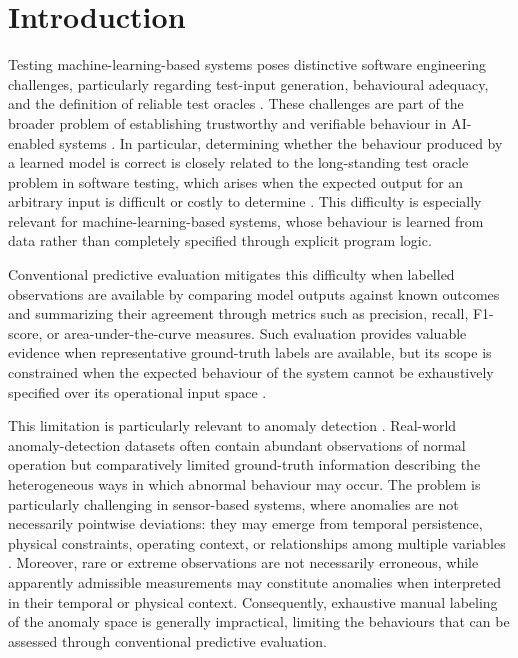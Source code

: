\documentclass[preprint,12pt]{elsarticle}
\begin{document}
\section{Introduction}
\label{sec:introduction}

Testing machine-learning-based systems poses distinctive software
engineering challenges, particularly regarding test-input generation,
behavioural adequacy, and the definition of reliable test oracles
\cite{riccio2020testing,benbraiek2020testingml,zhang2022mltesting}.
These challenges are part of the broader problem of establishing
trustworthy and verifiable behaviour in AI-enabled systems
\cite{seshia2022toward,huang2020safety}. In particular, determining whether
the behaviour produced by a learned model is correct is closely related to
the long-standing test oracle problem in software testing, which arises
when the expected output for an arbitrary input is difficult or costly to
determine \cite{barr2015oracle}. This difficulty is especially relevant for
machine-learning-based systems, whose behaviour is learned from data rather
than completely specified through explicit program logic.

Conventional predictive evaluation mitigates this difficulty when labelled
observations are available by comparing model outputs against known outcomes
and summarizing their agreement through metrics such as precision, recall,
F1-score, or area-under-the-curve measures. Such evaluation provides
valuable evidence when representative ground-truth labels are available,
but its scope is constrained when the expected behaviour of the system
cannot be exhaustively specified over its operational input space
\cite{riccio2020testing}.

This limitation is particularly relevant to anomaly detection
\cite{adhikari2024iotAnomalySurvey,gkountakos2024comprehensive}.
Real-world anomaly-detection datasets often contain abundant observations
of normal operation but comparatively limited ground-truth information
describing the heterogeneous ways in which abnormal behaviour may occur.
The problem is particularly challenging in sensor-based systems, where
anomalies are not necessarily pointwise deviations: they may emerge from
temporal persistence, physical constraints, operating context, or
relationships among multiple variables
\cite{karkouch2016data,teh2020sensor,zou2023sensorfault}. Moreover, rare or
extreme observations are not necessarily erroneous, while apparently
admissible measurements may constitute anomalies when interpreted in their
temporal or physical context. Consequently, exhaustive manual labeling of
the anomaly space is generally impractical, limiting the behaviours that
can be assessed through conventional predictive evaluation.
\end{document}
